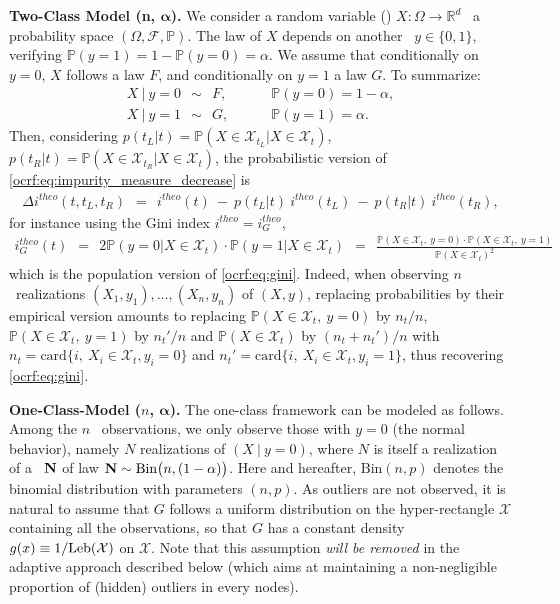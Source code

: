 \textbf{Two-Class Model (n, $\boldsymbol{\alpha}$).}
We consider a random variable (\rv) $ X:\Omega \to \mathbb{R}^d$ \wrt~a probability space $(\Omega, \mathcal{F}, \mathbb{P})$.
The law of $X$ depends on another \rv~$y \in \{0,1\}$, verifying $\mathbb{P}(y=1)=1-\mathbb{P}(y=0)=\alpha$. We assume that conditionally on $y=0$, $ X$ follows a law $F$, and conditionally on $y=1$ a law $G$. To summarize:
\begin{align*}
 X ~|~ y=0 ~~\sim~~ F, &~~~~~~~~~~  \mathbb{P}(y=0)=1-\alpha, \\
 X ~|~ y=1 ~~\sim~~ G, &~~~~~~~~~~  \mathbb{P}(y=1)=\alpha.
\end{align*}
Then, considering  $p(t_L | t) = \mathbb{P}( X\in \mathcal{X}_{t_L} |  X\in \mathcal{X}_t)$,  $p(t_R | t) = \mathbb{P}( X\in \mathcal{X}_{t_R} |  X\in \mathcal{X}_t)$, the probabilistic version of \eqref{ocrf:eq:impurity_measure_decrease} is
\begin{align}
\label{ocrf:eq:impurity_measure_decrease_theo}
\Delta i^{theo}(t, t_L, t_R) ~~=~~ i^{theo}(t) ~-~  p(t_L | t)~ i^{theo}(t_L) ~-~  p(t_R | t)~ i^{theo}(t_R),
\end{align}
for instance using the Gini index $i^{theo} = i_G^{theo}$,
\begin{align}
\label{ocrf:eq:gini_theo}
  i_G^{theo}(t) ~~=~~ 2 \mathbb{P}(y=0 |  X \in \mathcal{X}_t) \cdot \mathbb{P}(y=1 |  X \in \mathcal{X}_t)
 ~~=~~ \frac{\mathbb{P}(X \in \mathcal{X}_t,~ y = 0) \cdot \mathbb{P}(X \in \mathcal{X}_t,~ y = 1) }{\mathbb{P}(X \in \mathcal{X}_t)^2}
\end{align}
which is the population version of \eqref{ocrf:eq:gini}.
Indeed,
when observing $n$ \iid~realizations $( X_1, y_1),\ldots, ( X_n, y_n)$ of $( X,y)$, replacing probabilities by their empirical version amounts to replacing $\mathbb{P}(X \in \mathcal{X}_t,~ y = 0)$ by $n_t / n$, $\mathbb{P}(X \in \mathcal{X}_t,~ y = 1)$ by $n_t'/n$ and $\mathbb{P}(X \in \mathcal{X}_t)$ by $(n_t + n_t')/n$ with $n_t = \text{card}\{i,~X_i\in \mathcal{X}_t, y_i=0 \}$ and $n_t' = \text{card}\{i,~X_i\in \mathcal{X}_t, y_i=1 \}$, thus recovering \eqref{ocrf:eq:gini}.

\textbf{One-Class-Model ($n$, $\boldsymbol{\alpha}$).}
The one-class framework can be modeled as follows. Among the $n$ \iid~observations, we only observe those with $y=0$ (the normal behavior), namely $N$ realizations of $( X ~|~ y=0)$, where $N$ is itself a realization of a \rv~$\mathbf N$ of law $\mathbf N \sim \text{Bin}\big(n, (1-\alpha)\big)$. Here and hereafter, $\text{Bin}(n, p)$ denotes the binomial distribution with parameters $(n, p)$. As outliers are not observed, it is natural to assume that $G$ follows a uniform distribution on the hyper-rectangle $\mathcal{X}$ containing all the observations, so that $G$ has a constant density $g(x) \equiv 1 / \text{Leb}(\mathcal{X})$ on $\mathcal{X}$. %
Note that this assumption \emph{will be removed} in the adaptive approach described below (which aims at maintaining a non-negligible proportion of (hidden) outliers in every nodes).

